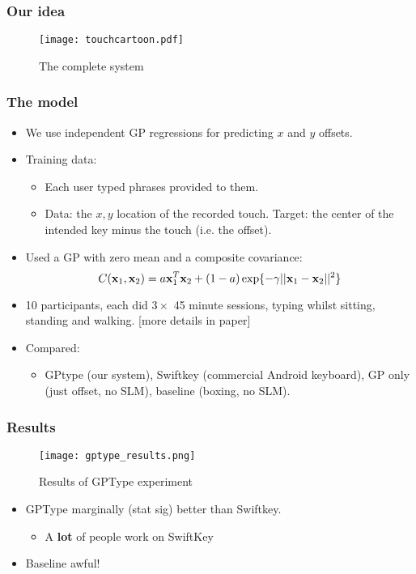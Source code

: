 \begin{frame}
	\frametitle{Our idea}
	\begin{figure}[tbh]
		\centering\texttt{[image: touchcartoon.pdf]}
		\centering\caption{\label{fig:touchcartoon}The complete system}
	\end{figure}
\end{frame}

\begin{frame}
	\frametitle{The model}
	\begin{itemize}
		\item We use independent GP regressions for predicting $x$ and $y$ offsets.
		\item Training data:
		\begin{itemize}
			\item Each user typed phrases provided to them.
			\item Data: the $x,y$ location of the recorded touch. Target: the center of the intended key minus the touch (i.e. the offset).
		\end{itemize}
		\item<2-> Used a \ac{GP} with zero mean and a composite covariance:
		\[
			C(\mathbf{x}_1,\mathbf{x}_2) = a \mathbf{x}_1^T\mathbf{x}_2 + (1-a)\exp \{ -\gamma || \mathbf{x}_1 - \mathbf{x}_2 ||^2 \}
		\]
		\item<3->10 participants, each did $3\times$ 45 minute sessions, typing whilst sitting, standing and walking. [more details in paper]
		\item<4->Compared:
		\begin{itemize}
			\item GPtype (our system), Swiftkey (commercial Android keyboard), GP only (just offset, no \ac{SLM}), baseline (boxing, no \ac{SLM}).
		\end{itemize}
	\end{itemize}
\end{frame}

\begin{frame}
	\frametitle{Results}
	\begin{figure}[tbh]
		\centering\texttt{[image: gptype\_results.png]}
		\centering\caption{\label{fig:gptype_results}Results of GPType experiment}
	\end{figure}
	\begin{itemize}
		\item GPType marginally (stat sig) better than Swiftkey.
		\begin{itemize}
			\item A {\bf lot} of people work on SwiftKey
		\end{itemize}
		\item Baseline awful!
	\end{itemize}
\end{frame}

